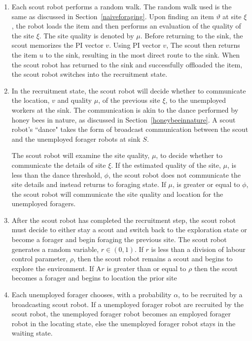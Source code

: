 \begin{enumerate}

\item Each scout robot performs a random walk. The random walk used is the same as discussed in Section~\ref{naiveforaging}. Upon finding an item $\vartheta$ at site $\xi$, the robot loads the item and then performs an evaluation of the quality of the site $\xi$. The site quality is denoted by $\mu$. Before returning to the sink, the scout memorizes the PI vector $v$. Using PI vector $v$, The scout then returns the item $u$ to the sink, resulting in the most direct route to the sink.  When the scout robot has returned to the sink and successfully offloaded the item, the scout robot switches into the recruitment state.

\item In the recruitment state, the scout robot will decide whether to communicate the location, $v$ and quality $\mu$, of the previous site $\xi$, to the unemployed workers at the sink. The communication is akin to the dance performed by honey bees in nature, as discussed in Section~\ref{honeybeeinnature}. A scout robot's ``dance" takes the form of broadcast communication between the scout and the unemployed forager robots at sink $S$.

The scout robot will examine the site quality, $\mu$, to decide whether to communicate the details of site $\xi$. If the estimated quality of the site, $\mu$, is less than the dance threshold, $\phi$, the scout robot does not communicate the site details and instead returns to foraging state. If $\mu$, is greater or equal to $\phi$, the scout robot will communicate the site quality and location for the unemployed foragers.

\item After the scout robot has completed the recruitment step, the scout robot must decide to either stay a scout and switch back to the exploration state or become a forager and begin foraging the previous site. The scout robot generates a random variable, $r\in(0,1)$. If $r$ is less than a division of labour control parameter, $\rho$, then the scout robot remains a scout and begins to explore the environment. If A$r$ is greater than or equal to $\rho$ then the scout becomes a forager and begins to location the prior site

\item Each unemployed forager chooses, with a probability $\alpha$, to be recruited by a broadcasting scout robot. If a unemployed forager robot are recruited by the scout robot, the unemployed forager robot becomes an employed forager robot in the locating state, else the unemployed forager robot stays in the waiting state.


\end{enumerate}
